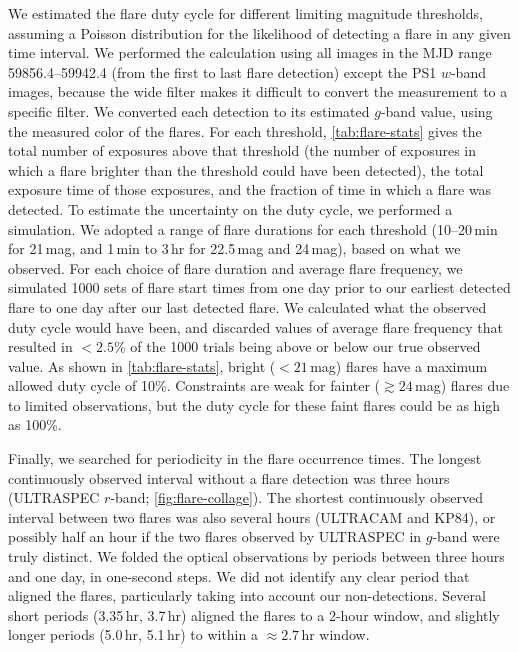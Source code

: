 \documentclass{nature_plusfigure}
\begin{document}
\begin{methods}
We estimated the flare duty cycle for different limiting magnitude thresholds, assuming a Poisson distribution for the likelihood of detecting a flare in any given time interval.
We performed the calculation using all images in the MJD range 59856.4--59942.4 (from the first to last flare detection) except the PS1 $w$-band images, because the wide filter makes it difficult to convert the measurement to a specific filter.
We converted each detection to its estimated $g$-band value, using the measured color of the flares.
For each threshold, \ref{tab:flare-stats} gives the total number of exposures above that threshold (the number of exposures in which a flare brighter than the threshold could have been detected), the total exposure time of those exposures, and the fraction of time in which a flare was detected. To estimate the uncertainty on the duty cycle, we performed a simulation. We adopted a range of flare durations for each threshold (10--20\,min for 21\,mag, and 1\,min to 3\,hr for 22.5\,mag and 24\,mag), based on what we observed. For each choice of flare duration and average flare frequency, we simulated 1000 sets of flare start times from one day prior to our earliest detected flare to one day after our last detected flare. We calculated what the observed duty cycle would have been, and discarded values of average flare frequency that resulted in $<2.5\%$ of the 1000 trials being above or below our true observed value.  As shown in \ref{tab:flare-stats}, bright ($<21$\,mag) flares have a maximum allowed duty cycle of 10\%. Constraints are weak for fainter ($\gtrsim24$\,mag) flares due to limited observations, but the duty cycle for these faint flares could be as high as 100\%.  

Finally, we searched for periodicity in the flare occurrence times. The longest continuously observed interval without a flare detection was three hours (ULTRASPEC $r$-band; \ref{fig:flare-collage}). The shortest continuously observed interval between two flares was also several hours (ULTRACAM and KP84), or possibly half an hour if the two flares observed by ULTRASPEC in $g$-band were truly distinct. We folded the optical observations by periods between three hours and one day, in one-second steps.
We did not identify any clear period that aligned the flares, particularly taking into account our non-detections.
Several short periods (3.35\,hr, 3.7\,hr) aligned the flares to a 2-hour window, and slightly longer periods (5.0\,hr, 5.1\,hr) to within a $\approx2.7$\,hr window.


\end{methods}
\end{document}

